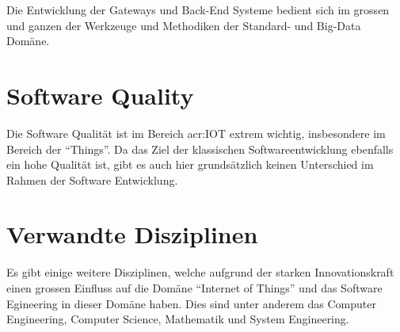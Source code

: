 Die Entwicklung der Gateways und Back-End Systeme bedient sich im grossen und ganzen der Werkzeuge und Methodiken der Standard- und Big-Data Domäne. 


\section{Software Quality}
Die Software Qualität ist im Bereich \gls{acr:IOT} extrem wichtig, insbesondere im Bereich der "`Things"'. Da das Ziel der klassischen Softwareentwicklung ebenfalls ein hohe Qualität ist, gibt es auch hier grundsätzlich keinen Unterschied im Rahmen der Software Entwicklung.


\section{Verwandte Disziplinen}
Es gibt einige weitere Disziplinen, welche aufgrund der starken Innovationskraft einen grossen Einfluss auf die Domäne "`Internet of Things"' und das Software Egineering in dieser Domäne haben. Dies sind unter anderem das Computer Engineering, Computer Science, Mathematik und System Engineering.
